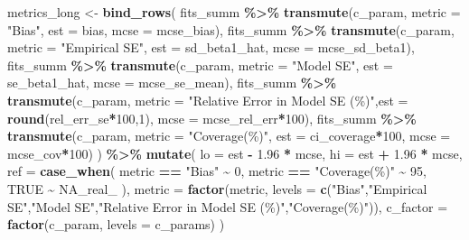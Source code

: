 \documentclass[
  twocolumn]{article}
\newenvironment{Shaded}{\begin{snugshade}}{\end{snugshade}}
\newcommand{\AttributeTok}[1]{\textcolor[rgb]{0.13,0.29,0.53}{#1}}
\newcommand{\ConstantTok}[1]{\textcolor[rgb]{0.56,0.35,0.01}{#1}}
\newcommand{\DecValTok}[1]{\textcolor[rgb]{0.00,0.00,0.81}{#1}}
\newcommand{\FloatTok}[1]{\textcolor[rgb]{0.00,0.00,0.81}{#1}}
\newcommand{\FunctionTok}[1]{\textcolor[rgb]{0.13,0.29,0.53}{\textbf{#1}}}
\newcommand{\NormalTok}[1]{#1}
\newcommand{\OtherTok}[1]{\textcolor[rgb]{0.56,0.35,0.01}{#1}}
\newcommand{\SpecialCharTok}[1]{\textcolor[rgb]{0.81,0.36,0.00}{\textbf{#1}}}
\newcommand{\StringTok}[1]{\textcolor[rgb]{0.31,0.60,0.02}{#1}}
\begin{document}
\begin{Shaded}
\begin{Highlighting}[]
\NormalTok{metrics\_long }\OtherTok{\textless{}{-}} \FunctionTok{bind\_rows}\NormalTok{(}
\NormalTok{  fits\_summ }\SpecialCharTok{\%\textgreater{}\%} \FunctionTok{transmute}\NormalTok{(c\_param, }\AttributeTok{metric =} \StringTok{"Bias"}\NormalTok{,                 }\AttributeTok{est =}\NormalTok{ bias,             }\AttributeTok{mcse =}\NormalTok{ mcse\_bias),}
\NormalTok{  fits\_summ }\SpecialCharTok{\%\textgreater{}\%} \FunctionTok{transmute}\NormalTok{(c\_param, }\AttributeTok{metric =} \StringTok{"Empirical SE"}\NormalTok{,         }\AttributeTok{est =}\NormalTok{ sd\_beta1\_hat,     }\AttributeTok{mcse =}\NormalTok{ mcse\_sd\_beta1),}
\NormalTok{  fits\_summ }\SpecialCharTok{\%\textgreater{}\%} \FunctionTok{transmute}\NormalTok{(c\_param, }\AttributeTok{metric =} \StringTok{"Model SE"}\NormalTok{,             }\AttributeTok{est =}\NormalTok{ se\_beta1\_hat,     }\AttributeTok{mcse =}\NormalTok{ mcse\_se\_mean),}
\NormalTok{  fits\_summ }\SpecialCharTok{\%\textgreater{}\%} \FunctionTok{transmute}\NormalTok{(c\_param, }\AttributeTok{metric =} \StringTok{"Relative Error in Model SE (\%)"}\NormalTok{,}\AttributeTok{est =} \FunctionTok{round}\NormalTok{(rel\_err\_se}\SpecialCharTok{*}\DecValTok{100}\NormalTok{,}\DecValTok{1}\NormalTok{),   }\AttributeTok{mcse =}\NormalTok{ mcse\_rel\_err}\SpecialCharTok{*}\DecValTok{100}\NormalTok{),}
\NormalTok{  fits\_summ }\SpecialCharTok{\%\textgreater{}\%} \FunctionTok{transmute}\NormalTok{(c\_param, }\AttributeTok{metric =} \StringTok{"Coverage(\%)"}\NormalTok{,          }\AttributeTok{est =}\NormalTok{ ci\_coverage}\SpecialCharTok{*}\DecValTok{100}\NormalTok{,  }\AttributeTok{mcse =}\NormalTok{ mcse\_cov}\SpecialCharTok{*}\DecValTok{100}\NormalTok{)}
\NormalTok{) }\SpecialCharTok{\%\textgreater{}\%}
  \FunctionTok{mutate}\NormalTok{(}
    \AttributeTok{lo =}\NormalTok{ est }\SpecialCharTok{{-}} \FloatTok{1.96} \SpecialCharTok{*}\NormalTok{ mcse,}
    \AttributeTok{hi =}\NormalTok{ est }\SpecialCharTok{+} \FloatTok{1.96} \SpecialCharTok{*}\NormalTok{ mcse,}
    \AttributeTok{ref =} \FunctionTok{case\_when}\NormalTok{(}
\NormalTok{      metric }\SpecialCharTok{==} \StringTok{"Bias"}        \SpecialCharTok{\textasciitilde{}} \DecValTok{0}\NormalTok{,}
\NormalTok{      metric }\SpecialCharTok{==} \StringTok{"Coverage(\%)"} \SpecialCharTok{\textasciitilde{}} \DecValTok{95}\NormalTok{,}
      \ConstantTok{TRUE} \SpecialCharTok{\textasciitilde{}} \ConstantTok{NA\_real\_}
\NormalTok{    ),}
    \AttributeTok{metric  =} \FunctionTok{factor}\NormalTok{(metric, }\AttributeTok{levels =} \FunctionTok{c}\NormalTok{(}\StringTok{"Bias"}\NormalTok{,}\StringTok{"Empirical SE"}\NormalTok{,}\StringTok{"Model SE"}\NormalTok{,}\StringTok{"Relative Error in Model SE (\%)"}\NormalTok{,}\StringTok{"Coverage(\%)"}\NormalTok{)),}
    \AttributeTok{c\_factor =} \FunctionTok{factor}\NormalTok{(c\_param, }\AttributeTok{levels =}\NormalTok{ c\_params) }
\NormalTok{  )}


\end{Highlighting}
\end{Shaded}
\end{document}
